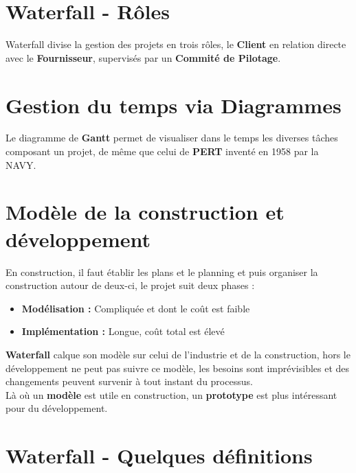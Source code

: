\documentclass{report}
\begin{document}
	\section{Waterfall - Rôles}

		Waterfall divise la gestion des projets en trois rôles, le \textbf{Client} en relation directe avec le \textbf{Fournisseur}, supervisés par un \textbf{Commité de Pilotage}.\\

	\section{Gestion du temps via Diagrammes}

		Le diagramme de \textbf{Gantt} permet de visualiser dans le temps les diverses tâches composant un projet, de même que celui de \textbf{PERT} inventé en 1958 par la NAVY.\\

	\section{Modèle de la construction et développement}

		En construction, il faut établir les plans et le planning et puis organiser la construction autour de deux-ci, le projet suit deux phases : \\

			\begin{itemize}
				\item \textbf{Modélisation : } Compliquée et dont le coût est faible
				\item \textbf{Implémentation : } Longue, coût total est élevé
			\end{itemize}	

		\textbf{Waterfall} calque son modèle sur celui de l'industrie et de la construction, hors le développement ne peut pas suivre ce modèle, les besoins sont imprévisibles et des changements peuvent survenir à tout instant du processus.\\

		Là où un \textbf{modèle} est utile en construction, un \textbf{prototype} est plus intéressant pour du développement.\\

	\section{Waterfall - Quelques définitions}
\end{document}
